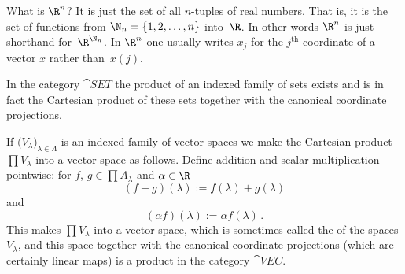 \begin{exam}\label{C015537} What is $\R^n$? It is just the set of all $n$-tuples of real numbers.
That is, it is the set of functions from $\N_n = \{1,2,\dots,n\}$ into~$\R$.  In other
words $\R^n$ is just shorthand for~$\R^{\N_n}$.  In $\R^n$ one usually writes $x_j$ for
the $j^{\text{th}}$ coordinate of a vector $x$ rather than~$x(j)$.
\end{exam}

\begin{exam} In the category $\cat{SET}$ the
product of an indexed family of sets exists and is in fact the Cartesian product of these
sets together with the canonical coordinate projections.
\end{exam}

\begin{exam}\label{C015544} If $\bigl(V_\lambda\bigr)_{\lambda \in \Lambda}$ is an indexed
family of vector spaces we make the Cartesian product $\prod V_\lambda$ into a vector
space as follows. Define addition and scalar multiplication pointwise: for $f$, $g \in
\prod A_\lambda$ and $\alpha \in \R$
  \[ (f + g)(\lambda) := f(\lambda) + g(\lambda)  \]
and
  \[ (\alpha f)(\lambda) := \alpha f(\lambda) \,. \]
This makes $\prod V_\lambda$ into a vector space, which is sometimes called the
 of the spaces $V_\lambda$, and this space together with the canonical
coordinate projections (which are certainly  linear maps) is a
product in the category $\cat{VEC}$.
\end{exam}

